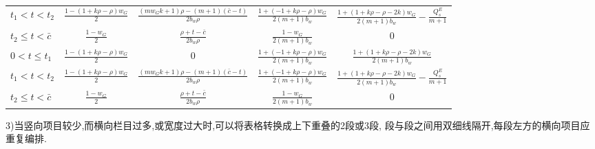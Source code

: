 \documentclass{setp-new}
\begin{document}
\begin{table}[H]
\begin{tabular}{lcccc}
 $t_{1}<t<t_{2}$  & $\frac{1-(1+k\rho-\rho)w_{G}}{2}$ & $ \frac{(mw_{G}k+1)\rho-(m+1)(\bar{c}-t)}{2 b_{w}\rho} $  &$ \frac{1+(-1+k\rho-\rho)w_{G}}{2(m+1)b_{w}} $ & $\frac{1+(1+k\rho-\rho-2k)w_{G}}{2(m+1)b_{w}}-\frac{Q_{s}^{E}}{m+1}$  \\
 $t_{2}\leq t<\bar{c}$ & $\frac{1-w_{G}}{2}$ & $\frac{\rho+t-\bar{c}}{2 b_{w}\rho}$ &$ \frac{1-w_{G}}{2(m+1)b_{w}} $ & 0  \\  $0<t\leq t_{1}$ & $\frac{1-(1+k\rho-\rho)w_{G}}{2}$ & 0 &$ \frac{1+(-1+k\rho-\rho)w_{G}}{2(m+1)b_{w}} $ &  $\frac{1+(1+k\rho-\rho-2k)w_{G}}{2(m+1)b_{w}}$ \\
 $t_{1}<t<t_{2}$  & $\frac{1-(1+k\rho-\rho)w_{G}}{2}$ & $ \frac{(mw_{G}k+1)\rho-(m+1)(\bar{c}-t)}{2 b_{w}\rho} $  &$ \frac{1+(-1+k\rho-\rho)w_{G}}{2(m+1)b_{w}} $ & $\frac{1+(1+k\rho-\rho-2k)w_{G}}{2(m+1)b_{w}}-\frac{Q_{s}^{E}}{m+1}$  \\
 $t_{2}\leq t<\bar{c}$ & $\frac{1-w_{G}}{2}$ & $\frac{\rho+t-\bar{c}}{2 b_{w}\rho}$ &$ \frac{1-w_{G}}{2(m+1)b_{w}} $ & 0  \\
\bottomrule
\end{tabular}%
\end{table}



3)当竖向项目较少,而横向栏目过多,或宽度过大时,可以将表格转换成上下重叠的2段或3段, 段与段之间用双细线隔开,每段左方的横向项目应重复编排.
\end{document}
